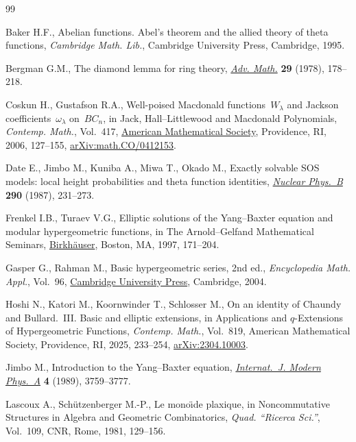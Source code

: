 \begin{thebibliography}{99}
\footnotesize\itemsep=0pt

Baker H.F., Abelian functions. Abel's theorem and the allied theory of theta
 functions, \textit{Cambridge Math. Lib.}, Cambridge University Press, Cambridge, 1995.

Bergman G.M., The diamond lemma for ring theory,
 \href{https://doi.org/10.1016/0001-8708(78)90010-5}{\textit{Adv. Math.}}
 \textbf{29} (1978), 178--218.

Coskun H., Gustafson R.A., Well-poised {M}acdonald functions~{$W_\lambda$} and
 {J}ackson coefficients~{$\omega_\lambda$} on~{$BC_n$}, in Jack,
 {H}all--{L}ittlewood and {M}acdonald {P}olynomials, \textit{Contemp. Math.},
 Vol.~417, \href{https://doi.org/10.1090/conm/417/07919}{American Mathematical
 Society}, Providence, RI, 2006, 127--155,
 \href{http://arxiv.org/abs/math.CO/0412153}{arXiv:math.CO/0412153}.

Date E., Jimbo M., Kuniba A., Miwa T., Okado M., Exactly solvable {SOS} models:
 local height probabilities and theta function identities,
 \href{https://doi.org/10.1016/0550-3213(87)90187-8}{\textit{Nuclear Phys.~B}}
 \textbf{290} (1987), 231--273.

Frenkel I.B., Turaev V.G., Elliptic solutions of the {Y}ang--{B}axter equation
 and modular hypergeometric functions, in The {A}rnold--{G}elfand
 {M}athematical {S}eminars,
 \href{https://doi.org/10.1007/978-1-4612-4122-5_9}{Birkh\"auser}, Boston, MA,
 1997, 171--204.

Gasper G., Rahman M., Basic hypergeometric series, 2nd ed., \textit{Encyclopedia Math.
 Appl.}, Vol.~96,
 \href{https://doi.org/10.1017/CBO9780511526251}{Cambridge University Press}, Cambridge, 2004.

Hoshi N., Katori M., Koornwinder T., Schlosser M., On an identity of {C}haundy
 and {B}ullard.~{III}. Basic and elliptic extensions, in Applications and
 {$q$}-{E}xtensions of {H}ypergeometric {F}unctions, \textit{Contemp. Math.},
 Vol.~819, American Mathematical Society, Providence, RI, 2025, 233--254,
 \href{http://arxiv.org/abs/2304.10003}{arXiv:2304.10003}.

Jimbo M., Introduction to the {Y}ang--{B}axter equation,
 \href{https://doi.org/10.1142/S0217751X89001503}{\textit{Internat.~J. Modern
 Phys.~A}} \textbf{4} (1989), 3759--3777.

Lascoux A., Sch\"utzenberger M.-P., Le mono\"{\i}de plaxique, in Noncommutative
 {S}tructures in {A}lgebra and {G}eometric {C}ombinatorics, \textit{Quad.
 ``Ricerca Sci.''}, Vol.~109, CNR, Rome, 1981, 129--156.


\end{thebibliography}
